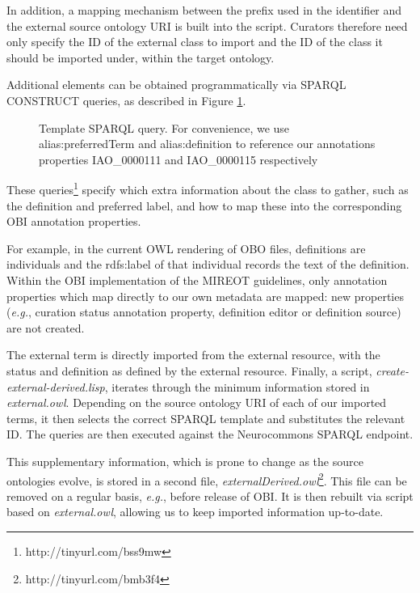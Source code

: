\documentclass[a4paper,10pt,twocolumn]{article}
\begin{document}
In addition, a mapping mechanism between the prefix used in the identifier and the external source ontology URI is built into the script.
Curators therefore need only specify the ID of the external class to import and the ID of the class it should be imported under, within the target ontology.


Additional elements can be obtained programmatically via SPARQL\cite{RefWorks:1531} CONSTRUCT queries, as described in Figure \ref{fig:sparql}.

\begin{figure}[t]
\scriptsize
 
\caption{Template SPARQL query. For convenience, we use alias:preferredTerm and
alias:definition to reference our annotations properties IAO\_0000111 and IAO\_0000115 \cite{RefWorks:1496} respectively}
\label{fig:sparql}
\end{figure}
These queries\footnote{http://tinyurl.com/bss9mw} specify which extra information about the class to gather, such as the definition and preferred label, and how to map these into the corresponding OBI annotation properties. 

For example, in the current \ac{OWL} rendering of \ac{OBO} files, definitions are individuals and the rdfs:label of that individual records the text of the definition. 
Within the \ac{OBI} implementation of the \ac{MIREOT} guidelines, only annotation properties which map directly to our own metadata are mapped: new properties (\emph{e.g.}, curation status annotation property, definition editor or definition source) are not created.


The external term is directly imported from the external resource, with the status and definition as defined by the external resource.
Finally, a script, \emph{create-external-derived.lisp}\cite{obiscripts}, iterates through the minimum information stored in \emph{external.owl}.
Depending on the source ontology URI of each of our imported terms, it then selects the correct SPARQL template and substitutes the relevant ID.
The queries are then executed against the Neurocommons SPARQL endpoint\cite{RefWorks:1540}.

This supplementary information, which is prone to change as the source ontologies evolve, is stored in a second file, \emph{externalDerived.owl}\footnote{http://tinyurl.com/bmb3f4}.
This file can be removed on a regular basis, \emph{e.g.}, before release of OBI.
It is then rebuilt via script based on \emph{external.owl}, allowing us to keep imported information up-to-date.
\end{document}
